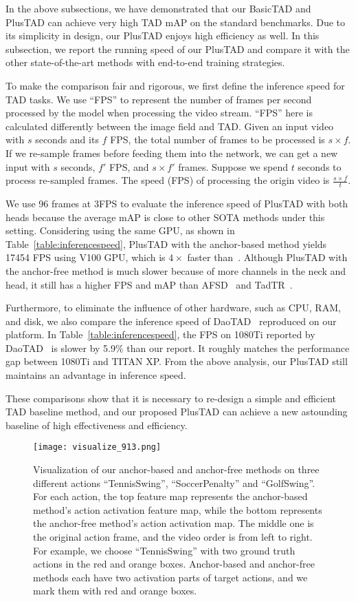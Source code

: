 \documentclass[a4paper,fleqn]{cas-dc}
\begin{document}
In the above subsections, we have demonstrated that our BasicTAD and PlusTAD can achieve very high TAD mAP on the standard benchmarks. Due to its simplicity in design, our PlusTAD enjoys high efficiency as well. In this subsection, we report the running speed of our PlusTAD and compare it with the other state-of-the-art methods with end-to-end training strategies.

To make the comparison fair and rigorous, we first define the inference speed for TAD tasks. 
We use ``FPS'' to represent the number of frames per second processed by the model when processing the video stream. 
``FPS'' here is calculated differently between the image field and TAD. Given an input video with $s$ seconds and its $f$ FPS, the total number of frames to be processed is $s\times f$. If we re-sample frames before feeding them into the network, we can get a new input with $s$ seconds, $f'$ FPS, and $s \times f'$ frames. Suppose we spend $t$ seconds to process re-sampled frames. The speed (FPS) of processing the origin video is $\frac{s \times f}{t}$.

We use 96 frames at 3FPS to evaluate the inference speed of PlusTAD with both heads because the average mAP is close to other SOTA methods under this setting. Considering using the same GPU, as shown in Table~\ref{table:inferencespeed}, PlusTAD with the anchor-based method yields 17454 FPS using V100 GPU, which is $4 \times$ faster than~\citep{afsd}. 
Although PlusTAD with the anchor-free method is much slower because of more channels in the neck and head, it still has a higher FPS and mAP than AFSD~\citep{afsd} and TadTR~\citep{e2e-TADTR}. 

Furthermore, to eliminate the influence of other hardware, such as CPU, RAM, and disk, we also compare the inference speed of DaoTAD~\citep{rgb_enough} reproduced on our platform. In Table~\ref{table:inferencespeed}, the FPS on 1080Ti reported by DaoTAD~\citep{rgb_enough} is slower by 5.9\% than our report. It roughly matches the performance gap between 1080Ti and TITAN XP. From the above analysis, our PlusTAD still maintains an advantage in inference speed.

These comparisons show that it is necessary to re-design a simple and efficient TAD baseline method, and our proposed PlusTAD can achieve a new astounding baseline of high effectiveness and efficiency.


\begin{figure*}[!t]
  \texttt{[image: visualize\_913.png]}
  \caption{Visualization of our anchor-based and anchor-free methods on three different actions ``TennisSwing'', ``SoccerPenalty'' and ``GolfSwing''. For each action, the top feature map represents the anchor-based method's action activation feature map, while the bottom represents the anchor-free method's action activation map. The middle one is the original action frame, and the video order is from left to right. For example, we choose ``TennisSwing'' with two ground truth actions in the red and orange boxes. Anchor-based and anchor-free methods each have two activation parts of target actions, and we mark them with red and orange boxes.
}
  \label{fig:crop}
\end{figure*}
\end{document}
